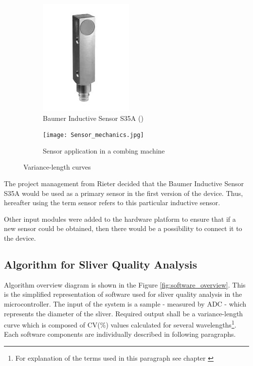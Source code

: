\documentclass[twoside]{ctuthesis}
\theoremstyle{plain}
\theoremstyle{definition}
\theoremstyle{note}
\begin{document}
\begin{figure}
	\centering
	\begin{subfigure}{0.5\textwidth}
		\centering
		\includegraphics[width=0.75\linewidth]{baumer_inductiveSensor.JPG}
		\caption{Baumer Inductive Sensor S35A (\cite{cite:InductiveSensor})}
		\label{fig:sensor_only}
	\end{subfigure}%
	\begin{subfigure}{0.5\textwidth}
		\centering
		\texttt{[image: Sensor\_mechanics.jpg]}
		\caption{Sensor application in a combing machine}
		\label{fig:sens_Mechanical}
	\end{subfigure}
	\caption{Variance-length curves}
	\label{fig:sensor_double}
\end{figure}

The project management from Rieter decided that the Baumer Inductive Sensor S35A would be used as a primary sensor in the first version of the device. Thus, hereafter using the term sensor refers to this particular inductive sensor.

Other input modules were added to the hardware platform to ensure that if a new sensor could be obtained, then there would be a possibility to connect it to the device.

\subsection{Algorithm for Sliver Quality Analysis}
\label{algorithmForSliver}
Algorithm overview diagram is shown in the Figure \ref{fig:software_overview}. This is the simplified representation of software used for sliver quality analysis in the microcontroller. The input of the system is a sample - measured by ADC - which represents the diameter of the sliver. Required output shall be a variance-length curve which is composed of CV(\%) values calculated for several wavelengths\footnote{\label{footnote1:textileTerms}For explanation of the terms used in this paragraph see chapter \cite{cite:TextileEngineering}}. Each software components are individually described in following paragraphs.
\end{document}
